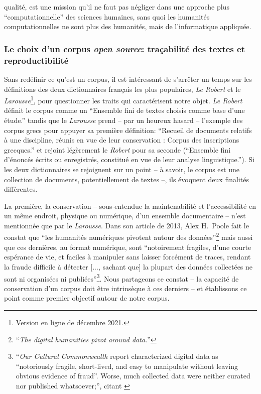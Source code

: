 qualité, est une mission qu'il ne faut pas négliger dans une approche plus ``computationnelle'' des sciences humaines, sans quoi les humanités computationnelles ne sont plus des humanités, mais de l'informatique appliquée.

\subsubsection{Le choix d’un corpus \textit{open source}: traçabilité des textes et reproductibilité}

Sans redéfinir ce qu'est un corpus, il est intéressant de s'arrêter un temps sur les définitions des deux dictionnaires français les plus populaires, \textit{Le Robert} et le \textit{Larousse}\footnote{Version en ligne de décembre 2021.}, pour questionner les traits qui caractérisent notre objet. \textit{Le Robert} définit le corpus comme un ``Ensemble fini de textes choisis comme base d'une étude.'' tandis que le \textit{Larousse} prend -- par un heureux hasard -- l'exemple des corpus grecs pour appuyer sa première définition: ``Recueil de documents relatifs à une discipline, réunis en vue de leur conservation : Corpus des inscriptions grecques.'' et rejoint légèrement le \textit{Robert} pour sa seconde (``Ensemble fini d'énoncés écrits ou enregistrés, constitué en vue de leur analyse linguistique.''). Si les deux dictionnaires se rejoignent sur un point --  à savoir, le corpus est une collection de documents, potentiellement de textes --, ils évoquent deux finalités différentes. 

La première, la conservation -- sous-entendue la maintenabilité et l'accessibilité en un même endroit, physique ou numérique, d'un ensemble documentaire -- n'est mentionnée que par le \textit{Larousse}. Dans son article de 2013, Alex H.~Poole fait le constat que ``les humanités numériques pivotent autour des données''\footnote{``\textit{The digital humanities pivot around data.}''\cite{poole_now_2013}} mais aussi que ces dernières, au format numérique, sont ``notoirement fragiles, d'une courte espérance de vie, et faciles à manipuler sans laisser forcément de traces, rendant la fraude difficile à détecter [..., sachant que] la plupart des données collectées ne sont ni organisées ni publiées''\footnote{``\textit{Our Cultural Commonwealth} report characterized digital data as “notoriously fragile, short-lived, and easy to manipulate without leaving obvious evidence of fraud”. Worse, much collected data were neither curated nor published whatsoever;'', \cite{poole_now_2013} citant \cite{unsworth2006our}}. Nous partageons ce constat -- la capacité de conservation d'un corpus doit être intrinsèque à ces derniers -- et établissons ce point comme premier objectif autour de notre corpus. 

